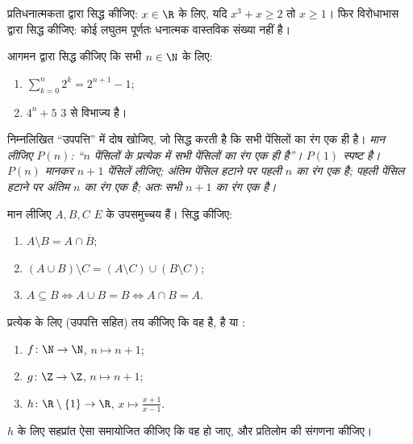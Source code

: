 \begin{exercise}[$\star$]\label{exo:b1:logic:3}
प्रतिधनात्मकता द्वारा सिद्ध कीजिए: $x \in \R$ के लिए, यदि $x^3 + x \geq 2$
तो $x \geq 1$। फिर विरोधाभास द्वारा सिद्ध कीजिए: कोई लघुतम पूर्णतः धनात्मक
वास्तविक संख्या नहीं है।
\end{exercise}

\begin{exercise}[$\star$]\label{exo:b1:logic:4}
आगमन द्वारा सिद्ध कीजिए कि सभी $n \in \N$ के लिए:
\begin{enumerate}
  \item $\sum_{k=0}^{n} 2^k = 2^{n+1} - 1$;
  \item $4^n + 5$ $3$ से विभाज्य है।
\end{enumerate}
\end{exercise}

\begin{exercise}[$\star$]\label{exo:b1:logic:5}
निम्नलिखित ``उपपत्ति'' में दोष खोजिए, जो सिद्ध करती है कि सभी पेंसिलों का
रंग एक ही है। \emph{मान लीजिए $P(n)$: ``$n$ पेंसिलों के प्रत्येक  में
सभी पेंसिलों का रंग एक ही है''। $P(1)$ स्पष्ट है। $P(n)$ मानकर $n+1$
पेंसिलें लीजिए; अंतिम पेंसिल हटाने पर पहली $n$ का रंग एक है; पहली पेंसिल
हटाने पर अंतिम $n$ का रंग एक है; अतः सभी $n+1$ का रंग एक है।}
\end{exercise}

\begin{exercise}[$\star$]\label{exo:b1:logic:6}
मान लीजिए $A, B, C$ $E$ के उपसमुच्चय हैं। सिद्ध कीजिए:
\begin{enumerate}
  \item $A \setminus B = A \cap \overline{B}$;
  \item $(A \cup B) \setminus C = (A \setminus C) \cup (B \setminus
        C)$;
  \item $A \subseteq B \iff A \cup B = B \iff A \cap B = A$.
\end{enumerate}
\end{exercise}

\begin{exercise}[$\star\star$]\label{exo:b1:logic:7}
प्रत्येक  के लिए (उपपत्ति सहित) तय कीजिए कि वह  है, 
है या :
\begin{enumerate}
  \item $f \colon \N \to \N$, $n \mapsto n + 1$;
  \item $g \colon \Z \to \Z$, $n \mapsto n + 1$;
  \item $h \colon \R \setminus \{1\} \to \R$, $x \mapsto
        \frac{x+1}{x-1}$.
\end{enumerate}
$h$ के लिए सहप्रांत ऐसा समायोजित कीजिए कि वह  हो जाए, और
प्रतिलोम की संगणना कीजिए।
\end{exercise}

